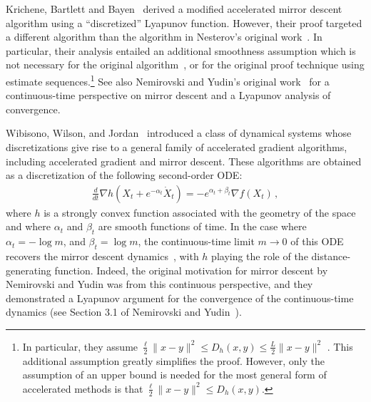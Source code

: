 \documentclass[11pt]{article}
\theoremstyle{plain}
\begin{document}
Krichene, Bartlett and Bayen~\cite{Krichene15} derived a modified accelerated mirror descent algorithm using a ``discretized'' Lyapunov function. However, their proof targeted a different algorithm than the algorithm in Nesterov's original work~\cite{Nesterov05}. In particular, their analysis entailed an additional smoothness assumption which is not necessary for the original algorithm~\cite{Nesterov05}, or for the original proof technique using estimate sequences.\footnote{In particular, they assume $\frac{\ell }{2} \|x-y\|^2 \leq  D_h(x,y) \leq \frac{L}{2}\|x-y\|^2$%
. This additional assumption greatly simplifies the proof. However, only the assumption of an upper bound is needed for the most general form of accelerated methods is that $\frac{\ell }{2} \|x-y\|^2 \leq  D_h(x,y)$.} See also Nemirovski and Yudin's original work~\cite{NemirovskiiYudin} for a continuous-time perspective on mirror descent and a Lyapunov analysis of convergence.

Wibisono, Wilson, and Jordan~\cite{Acceleration} introduced a class of dynamical systems whose discretizations give rise to a general family of accelerated gradient algorithms, including accelerated gradient and mirror descent. These algorithms are obtained as a discretization of the following second-order ODE:
 \begin{align} \label{Eq:ELBreg} 
\frac{d}{dt} \nabla h(X_t + e^{-\alpha_t} \dot X_t) = -e^{\alpha_t+\beta_t} \nabla f(X_t)\,,
\end{align}
where $h$ is a strongly convex function associated with the geometry of the space and where $\alpha_t$ and $\beta_t$ are smooth functions of time.  In the case where $\alpha_t=-\log m$, and $\beta_t = \log m$,  the continuous-time limit $m \rightarrow 0$ of this ODE recovers the mirror descent dynamics~\cite[(78)]{Acceleration}, with $h$ playing the role of the distance-generating function.  Indeed, the original motivation for mirror descent by Nemirovski and Yudin was from this continuous perspective, and they demonstrated a Lyapunov argument for the convergence of the continuous-time dynamics (see Section 3.1 of Nemirovski and Yudin~\cite{NemirovskiiYudin}).
\end{document}
